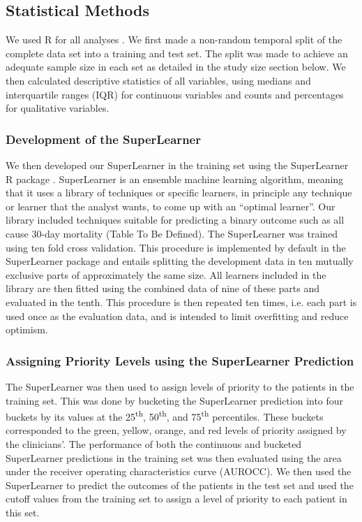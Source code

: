 \documentclass[10pt,letterpaper]{article}\usepackage[]{graphicx}\usepackage[]{color}
\begin{document}
\subsection*{Statistical Methods}
We used R for all analyses \cite{R}. We first made a non-random temporal split
of the complete data set into a training and test set. The split was made to
achieve an adequate sample size in each set as detailed in the study size
section below. We then calculated descriptive statistics of all variables, using
medians and interquartile ranges (IQR) for continuous variables and counts and
percentages for qualitative variables.

\subsubsection*{Development of the SuperLearner}
We then developed our SuperLearner in the training set using the SuperLearner R
package \cite{SuperLearner}. SuperLearner is an ensemble machine learning
algorithm, meaning that it uses a library of techniques or specific learners, in
principle any technique or learner that the analyst wants, to come up with an
``optimal learner''. Our library included techniques suitable for predicting a
binary outcome such as all cause 30-day mortality (Table To Be Defined). The
SuperLearner was trained using ten fold cross validation. This procedure is
implemented by default in the SuperLearner package and entails splitting the
development data in ten mutually exclusive parts of approximately the same
size. All learners included in the library are then fitted using the combined
data of nine of these parts and evaluated in the tenth. This procedure is then
repeated ten times, i.e. each part is used once as the evaluation data, and is
intended to limit overfitting and reduce optimism.

\subsubsection*{Assigning Priority Levels using the SuperLearner Prediction}
The SuperLearner was then used to assign levels of priority to the patients in
the training set. This was done by bucketing the SuperLearner prediction into
four buckets by its values at the 25\textsuperscript{th},
50\textsuperscript{th}, and 75\textsuperscript{th} percentiles. These buckets
corresponded to the green, yellow, orange, and red levels of priority assigned
by the clinicians'. The performance of both the continuous and bucketed
SuperLearner predictions in the training set was then evaluated using the area
under the receiver operating characteristics curve (AUROCC). We then used the
SuperLearner to predict the outcomes of the patients in the test set and used
the cutoff values from the training set to assign a level of priority to each
patient in this set.
\end{document}
